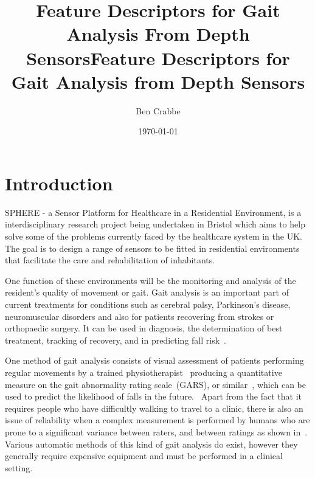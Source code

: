 \documentclass[11pt]{article} %
\title{%
Feature Descriptors for Gait Analysis From Depth Sensors}
\begin{document}
\title{Feature Descriptors for Gait Analysis from Depth Sensors}



\author{Ben Crabbe}

\date{\today}



\maketitle

\section{Introduction}
\label{sec:intro}
SPHERE - a Sensor Platform for Healthcare in a Residential Environment, is a interdisciplinary research project being undertaken in Bristol which aims to help solve some of the problems currently faced by the healthcare system in the UK. The goal is to design a range of sensors to be fitted in residential environments that facilitate the care and rehabilitation of inhabitants. 

One function of these environments will be the monitoring and analysis of the resident’s quality of movement or gait. Gait analysis is an important part of current treatments for conditions such as cerebral palsy, Parkinson's disease, neuromuscular disorders and also for patients recovering from strokes or orthopaedic surgery. It can be used in diagnosis, the determination of best treatment, tracking of recovery, and in predicting fall risk~\cite{Perry1992}. 

One method of gait analysis consists of visual assessment of patients performing regular movements by a trained physiotherapist~\cite{Whittle1996} producing a quantitative measure on the gait abnormality rating scale~(GARS), or similar~\cite{Cimolin2014,Hamacher2011}, which can be used to predict the likelihood of falls in the future.~\cite{VanSwearingen1996,Wolfson1990} Apart from the fact that it requires people who have difficultly walking to travel to a clinic, there is also an issue of reliability when a complex measurement is performed by humans who are prone to a significant variance between raters, and between ratings as shown in~\cite{Krebs1985}. Various automatic methods of this kind of gait analysis do exist, however they generally require expensive equipment and must be performed in a clinical setting. 
\end{document}
